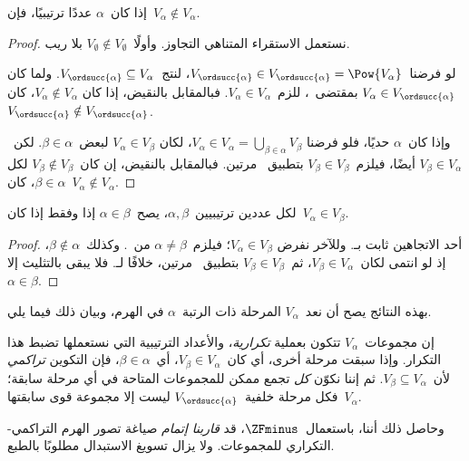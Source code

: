 \documentclass[../../../include/open-logic-section]{subfiles}
\begin{document}
\begin{lem}
إذا كان~$\alpha$ عددًا ترتيبيًا، فإن~$V_\alpha \notin V_\alpha$.
\end{lem}

\begin{proof}
نستعمل الاستقراء المتناهي التجاوز. وأولًا~$V_\emptyset \notin V_\emptyset$
بلا ريب.

لو فرضنا~$V_{\ordsucc{\alpha}} \in V_{\ordsucc{\alpha}} = \Pow{V_\alpha}$،
لنتج~$V_{\ordsucc{\alpha}} \subseteq V_\alpha$. ولما كان
$V_\alpha \in V_{\ordsucc{\alpha}}$ بمقتضى~،
للزم~$V_\alpha \in V_\alpha$. فبالمقابل بالنقيض، إذا كان
$V_\alpha \notin V_\alpha$، كان~$V_{\ordsucc{\alpha}} \notin V_{\ordsucc{\alpha}}$.

وإذا كان~$\alpha$ حديًا، فلو فرضنا
$V_\alpha \in V_\alpha = \bigcup_{\beta \in \alpha}V_\beta$، لكان
$V_\alpha \in V_\beta$ لبعض~$\beta \in \alpha$. لكن~$V_\beta \in V_\alpha$
أيضًا، فيلزم~$V_\beta \in V_\beta$ بتطبيق~
مرتين. فبالمقابل بالنقيض، إن كان~$V_\beta \notin V_\beta$ لكل
$\beta \in \alpha$، كان~$V_\alpha \notin V_\alpha$.
\end{proof}

\begin{cor}
لكل عددين ترتيبيين~$\alpha, \beta$، يصح~$\alpha \in \beta$ إذا
وفقط إذا كان~$V_\alpha \in V_\beta$.
\end{cor}

\begin{proof}
أحد الاتجاهين ثابت بـ. وللآخر نفرض
$V_\alpha \in V_\beta$؛ فيلزم~$\alpha \neq \beta$ من~.
وكذلك~$\beta \notin \alpha$، إذ لو انتمى لكان~$V_\beta \in V_\alpha$،
ثم~$V_\beta \in V_\beta$ بتطبيق~ مرتين،
خلافًا لـ. فلا يبقى بالتثليث إلا~$\alpha \in \beta$.
\end{proof}
\noindent
بهذه النتائج يصح أن نعد~$V_\alpha$ المرحلة ذات الرتبة~$\alpha$
في الهرم، وبيان ذلك فيما يلي.

إن مجموعات~$V_\alpha$ تتكون بعملية \emph{تكرارية}، والأعداد
الترتيبية التي نستعملها تضبط هذا التكرار. وإذا سبقت مرحلة أخرى،
أي كان~$V_\beta \in V_\alpha$، أي~$\beta \in \alpha$، فإن التكوين
\emph{تراكمي} لأن~$V_\beta \subseteq V_\alpha$. ثم إننا نكوّن
\emph{كل} تجمع ممكن للمجموعات المتاحة في أي مرحلة سابقة؛ فكل مرحلة
خلفية~$V_{\ordsucc{\alpha}}$ ليست إلا مجموعة قوى سابقتها~$V_\alpha$.

وحاصل ذلك أننا، باستعمال~$\ZFminus$، قد \emph{قاربنا إتمام} صياغة
تصور الهرم التراكمي-التكراري للمجموعات. ولا يزال تسويغ الاستبدال
مطلوبًا بالطبع.
\end{document}
